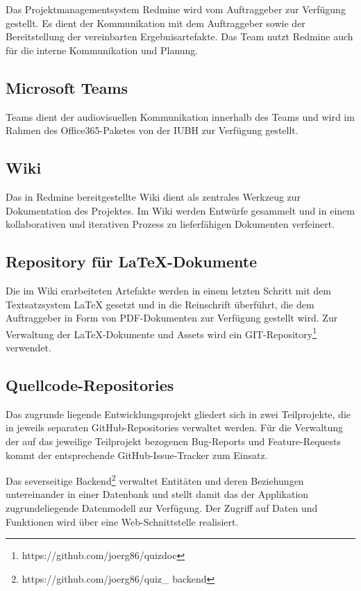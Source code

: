 \documentclass[a4paper,11pt,listof=numbered,glossary=totoc,parskip=half]{scrreprt}
\begin{document}
Das Projektmanagementsystem Redmine wird vom Auftraggeber zur Verfügung gestellt.
Es dient der Kommunikation mit dem Auftraggeber sowie der Bereitstellung der vereinbarten Ergebnisartefakte.
Das Team nutzt Redmine auch für die interne Kommunikation und Planung.

\subsection{Microsoft Teams}

Teams dient der audiovisuellen Kommunikation innerhalb des Teams und wird im Rahmen des Office365-Paketes von der IUBH zur Verfügung gestellt.

\subsection{Wiki}

Das in Redmine bereitgestellte Wiki dient als zentrales Werkzeug zur Dokumentation des Projektes.
Im Wiki werden Entwürfe gesammelt und in einem kollaborativen und iterativen Prozess zu lieferfähigen Dokumenten verfeinert.

\subsection{Repository für LaTeX-Dokumente}

Die im Wiki erarbeiteten Artefakte werden in einem letzten Schritt mit dem Textsatzsystem LaTeX gesetzt und in die Reinschrift überführt, die dem Auftraggeber in Form von PDF-Dokumenten zur Verfügung gestellt wird.
Zur Verwaltung der LaTeX-Dokumente und Assets wird ein GIT-Repository\footnote{https://github.com/joerg86/quizdoc} verwendet.

\subsection{Quellcode-Repositories}

Das zugrunde liegende Entwicklungsprojekt gliedert sich in zwei Teilprojekte, die in jeweils separaten GitHub-Repositories verwaltet werden.
Für die Verwaltung der auf das jeweilige Teilprojekt bezogenen Bug-Reports und Feature-Requests kommt der entsprechende GitHub-Issue-Tracker zum Einsatz.

Das severseitige Backend\footnote{{https://github.com/joerg86/quiz\_ backend}} verwaltet Entitäten und deren Beziehungen untereinander in einer Datenbank und stellt damit das der Applikation zugrundeliegende Datenmodell zur Verfügung. 
Der Zugriff auf Daten und Funktionen wird über eine Web-Schnittstelle realisiert.
\end{document}
